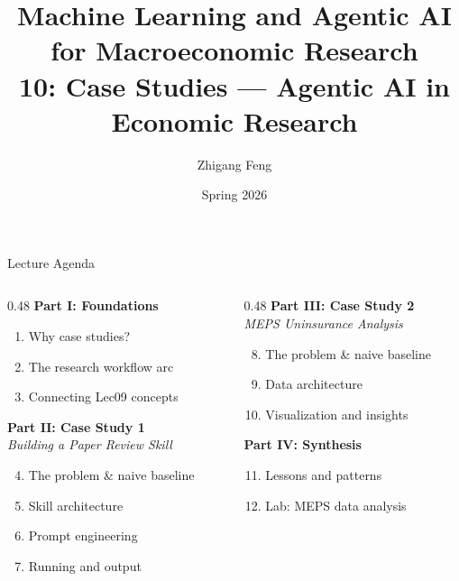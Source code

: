 \documentclass[10pt,english,aspectratio=169]{beamer}
\title[ML \& Agentic AI for Macro Research]{Machine Learning and Agentic AI for Macroeconomic Research\\
10: Case Studies --- Agentic AI in Economic Research\\[0.5em]}
\author{Zhigang Feng}
\date{Spring 2026}
\newcommand\makebeamertitle{\frame{\maketitle}}%
\begin{document}
\makebeamertitle


\begin{frame}{Lecture Agenda}

\begin{columns}[T]
\begin{column}{0.48\textwidth}
\textbf{Part I: Foundations}
\begin{enumerate}
    \item Why case studies?
    \item The research workflow arc
    \item Connecting Lec09 concepts
\end{enumerate}

\vspace{0.3cm}
\textbf{Part II: Case Study 1}\\
\textit{Building a Paper Review Skill}
\begin{enumerate}
  \setcounter{enumi}{3}
    \item The problem \& naive baseline
    \item Skill architecture
    \item Prompt engineering
    \item Running and output
\end{enumerate}
\end{column}

\begin{column}{0.48\textwidth}
\textbf{Part III: Case Study 2}\\
\textit{MEPS Uninsurance Analysis}
\begin{enumerate}
  \setcounter{enumi}{7}
    \item The problem \& naive baseline
    \item Data architecture
    \item Visualization and insights
\end{enumerate}

\vspace{0.3cm}
\textbf{Part IV: Synthesis}
\begin{enumerate}
  \setcounter{enumi}{10}
    \item Lessons and patterns
    \item Lab: MEPS data analysis
\end{enumerate}
\end{column}
\end{columns}

\end{frame}
\end{document}
